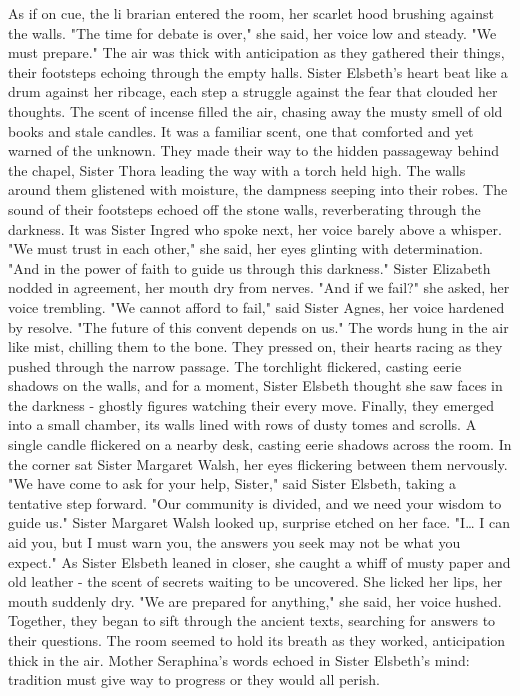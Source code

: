 \documentclass[11pt]{article}
\begin{document}
As if on cue, the li brarian entered the room, her scarlet hood brushing against the walls. "The time for debate is over," she said, her voice low and steady. "We must prepare."
The air was thick with anticipation as they gathered their things, their footsteps echoing through the empty halls. Sister Elsbeth's heart beat like a drum against her ribcage, each step a struggle against the fear that clouded her thoughts. The scent of incense filled the air, chasing away the musty smell of old books and stale candles. It was a familiar scent, one that comforted and yet warned of the unknown.
They made their way to the hidden passageway behind the chapel, Sister Thora leading the way with a torch held high. The walls around them glistened with moisture, the dampness seeping into their robes. The sound of their footsteps echoed off the stone walls, reverberating through the darkness.
It was Sister Ingred who spoke next, her voice barely above a whisper. "We must trust in each other," she said, her eyes glinting with determination. "And in the power of faith to guide us through this darkness."
Sister Elizabeth nodded in agreement, her mouth dry from nerves. "And if we fail?" she asked, her voice trembling.
"We cannot afford to fail," said Sister Agnes, her voice hardened by resolve. "The future of this convent depends on us."
The words hung in the air like mist, chilling them to the bone. They pressed on, their hearts racing as they pushed through the narrow passage. The torchlight flickered, casting eerie shadows on the walls, and for a moment, Sister Elsbeth thought she saw faces in the darkness - ghostly figures watching their every move.
Finally, they emerged into a small chamber, its walls lined with rows of dusty tomes and scrolls. A single candle flickered on a nearby desk, casting eerie shadows across the room. In the corner sat Sister Margaret Walsh, her eyes flickering between them nervously.
"We have come to ask for your help, Sister," said Sister Elsbeth, taking a tentative step forward. "Our community is divided, and we need your wisdom to guide us."
Sister Margaret Walsh looked up, surprise etched on her face. "I\ldots{} I can aid you, but I must warn you, the answers you seek may not be what you expect."
As Sister Elsbeth leaned in closer, she caught a whiff of musty paper and old leather - the scent of secrets waiting to be uncovered. She licked her lips, her mouth suddenly dry. "We are prepared for anything," she said, her voice hushed.
Together, they began to sift through the ancient texts, searching for answers to their questions. The room seemed to hold its breath as they worked, anticipation thick in the air. Mother Seraphina's words echoed in Sister Elsbeth's mind: tradition must give way to progress or they would all perish.
\end{document}
